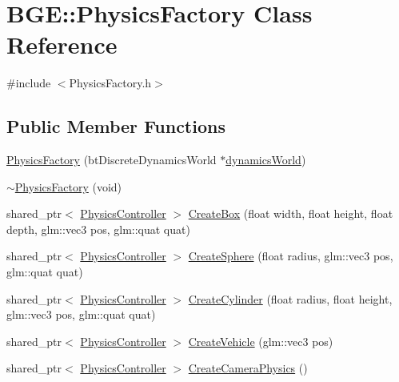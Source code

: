 \hypertarget{class_b_g_e_1_1_physics_factory}{\section{B\-G\-E\-:\-:Physics\-Factory Class Reference}
\label{class_b_g_e_1_1_physics_factory}
}


{\ttfamily \#include $<$Physics\-Factory.\-h$>$}

\subsection*{Public Member Functions}
\begin{DoxyCompactItemize}
\item 
\hyperlink{class_b_g_e_1_1_physics_factory_a9372cb374eb24e897916835ce630edef}{Physics\-Factory} (bt\-Discrete\-Dynamics\-World $\ast$\hyperlink{class_b_g_e_1_1_physics_factory_a46bbcd5b2abd9ec8f1ca8fd04bff9b61}{dynamics\-World})
\item 
\hyperlink{class_b_g_e_1_1_physics_factory_adc21bb9f057aa507963e0a6e1168ee79}{$\sim$\-Physics\-Factory} (void)
\item 
shared\-\_\-ptr$<$ \hyperlink{class_b_g_e_1_1_physics_controller}{Physics\-Controller} $>$ \hyperlink{class_b_g_e_1_1_physics_factory_a7e737e2cd283f9388e1c7691114790be}{Create\-Box} (float width, float height, float depth, glm\-::vec3 pos, glm\-::quat quat)
\item 
shared\-\_\-ptr$<$ \hyperlink{class_b_g_e_1_1_physics_controller}{Physics\-Controller} $>$ \hyperlink{class_b_g_e_1_1_physics_factory_a0c7dba14ad7b41710ab62c12a1a26ebe}{Create\-Sphere} (float radius, glm\-::vec3 pos, glm\-::quat quat)
\item 
shared\-\_\-ptr$<$ \hyperlink{class_b_g_e_1_1_physics_controller}{Physics\-Controller} $>$ \hyperlink{class_b_g_e_1_1_physics_factory_ace3dcd019b8100cb06d5bb42a9045d16}{Create\-Cylinder} (float radius, float height, glm\-::vec3 pos, glm\-::quat quat)
\item 
shared\-\_\-ptr$<$ \hyperlink{class_b_g_e_1_1_physics_controller}{Physics\-Controller} $>$ \hyperlink{class_b_g_e_1_1_physics_factory_a93b01c37fb6aafa5170219783d0afb2c}{Create\-Vehicle} (glm\-::vec3 pos)
\item 
shared\-\_\-ptr$<$ \hyperlink{class_b_g_e_1_1_physics_controller}{Physics\-Controller} $>$ \hyperlink{class_b_g_e_1_1_physics_factory_ac1960cd5fd77138386104e2a9fceac66}{Create\-Camera\-Physics} ()
\item 

\end{DoxyCompactItemize}

